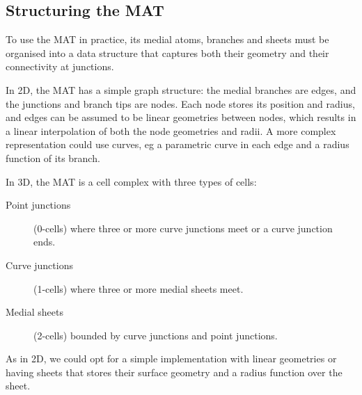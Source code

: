 
\subsection{Structuring the MAT}
To use the MAT in practice, its medial atoms, branches and sheets must be organised into a data structure that captures both their geometry and their connectivity at junctions.

In 2D, the MAT has a simple graph structure: the medial branches are edges, and the junctions and branch tips are nodes.
Each node stores its position and radius, and edges can be assumed to be linear geometries between nodes, which results in a linear interpolation of both the node geometries and radii.
A more complex representation could use curves, eg a parametric curve in each edge and a radius function of its branch.

In 3D, the MAT is a cell complex with three types of cells:
\begin{description}
	\item[Point junctions] (0-cells) where three or more curve junctions meet or a curve junction ends.
	\item[Curve junctions] (1-cells) where three or more medial sheets meet.
	\item[Medial sheets] (2-cells) bounded by curve junctions and point junctions.
\end{description}
As in 2D, we could opt for a simple implementation with linear geometries or having sheets that stores their surface geometry and a radius function over the sheet.


